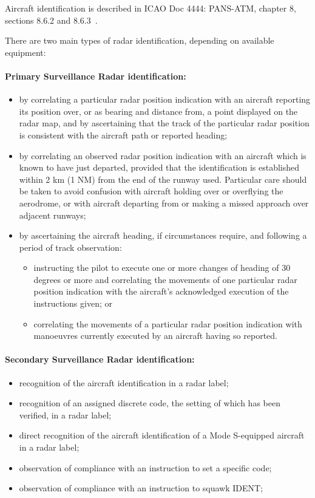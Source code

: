 Aircraft identification is described in ICAO Doc 4444: PANS-ATM, chapter 8, sections 8.6.2 and 8.6.3~\cite{4444}.

There are two main types of radar identification, depending on available equipment:

\paragraph{Primary Surveillance Radar identification:} \cite[sect. 8.6.2.4]{4444}
\begin{itemize}
    \item by correlating a particular radar position indication with an aircraft reporting its position over, or as bearing and distance from, a point displayed on the radar map, and by ascertaining that the track of the particular radar position is consistent with the aircraft path or reported heading;
    \item by correlating an observed radar position indication with an aircraft which is known to have just departed, provided that the identification is established within 2 km (1 NM) from the end of the runway used. Particular care should be taken to avoid confusion with aircraft holding over or overflying the aerodrome, or with aircraft departing from or making a missed approach over adjacent runways;
    \item  by ascertaining the aircraft heading, if circumstances require, and following a period of track observation:
          \begin{itemize}
              \item instructing the pilot to execute one or more changes of heading of 30 degrees or more and correlating the movements of one particular radar position indication with the aircraft's acknowledged execution of the instructions given; or
              \item correlating the movements of a particular radar position indication with manoeuvres currently executed by an aircraft having so reported.
          \end{itemize}
\end{itemize}

\paragraph{Secondary Surveillance Radar identification:} \cite[sect. 8.6.2.3]{4444}
\begin{itemize}
    \item  recognition of the aircraft identification in a radar label;
    \item  recognition of an assigned discrete code, the setting of which has been verified, in a radar label;
    \item direct recognition of the aircraft identification of a Mode S-equipped aircraft in a radar label;
    \item observation of compliance with an instruction to set a specific code;
    \item observation of compliance with an instruction to squawk IDENT;
\end{itemize}

